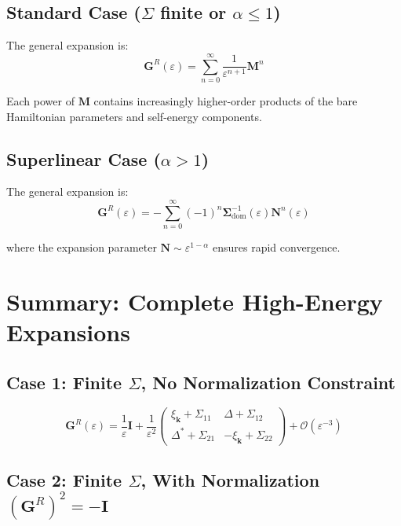 \documentclass[12pt]{article}
\begin{document}
\subsection{Standard Case ($\Sigma$ finite or $\alpha \leq 1$)}
The general expansion is:
\begin{equation}
\mathbf{G}^R(\varepsilon) = \sum_{n=0}^{\infty} \frac{1}{\varepsilon^{n+1}} \mathbf{M}^n
\end{equation}

Each power of $\mathbf{M}$ contains increasingly higher-order products of the bare Hamiltonian parameters and self-energy components.

\subsection{Superlinear Case ($\alpha > 1$)}
The general expansion is:
\begin{equation}
\mathbf{G}^R(\varepsilon) = -\sum_{n=0}^{\infty} (-1)^n \mathbf{\Sigma}_{\text{dom}}^{-1}(\varepsilon) \mathbf{N}^n(\varepsilon)
\end{equation}

where the expansion parameter $\mathbf{N} \sim \varepsilon^{1-\alpha}$ ensures rapid convergence.

\section{Summary: Complete High-Energy Expansions}

\subsection{Case 1: Finite $\Sigma$, No Normalization Constraint}

\begin{equation}
\mathbf{G}^R(\varepsilon) = \frac{1}{\varepsilon}\mathbf{I} + \frac{1}{\varepsilon^2}\begin{pmatrix}
\xi_{\mathbf{k}} + \Sigma_{11} & \Delta + \Sigma_{12} \\
\Delta^* + \Sigma_{21} & -\xi_{\mathbf{k}} + \Sigma_{22}
\end{pmatrix} + \mathcal{O}(\varepsilon^{-3})
\end{equation}

\subsection{Case 2: Finite $\Sigma$, With Normalization $(\mathbf{G}^R)^2 = -\mathbf{I}$}
\end{document}
